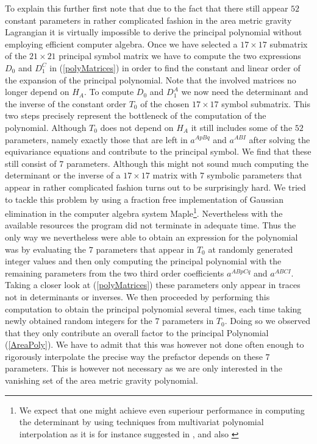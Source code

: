 \documentclass[a4paper,12pt, DIV=14, BCOR=5mm, twoside, headsepline]{scrbook}
\begin{document}
To explain this further first note that due to the fact that there still appear $52$ constant parameters in rather complicated fashion in the area metric gravity Lagrangian it is virtually impossible to derive the principal polynomial without employing efficient computer algebra. Once we have selected a $17 \times 17$ submatrix of the $21 \times 21$ principal symbol matrix we have to compute the two expressions $D_0$ and $D_{1}^C$ in (\ref{polyMatrices}) in order to find the constant and linear order of the expansion of the principal polynomial. Note that the involved matrices no longer depend on $H_A$. To compute $D_0$ and $D_1^A$ we now need the determinant and the inverse of the constant order $T_0$ of the chosen $17 \times 17$ symbol submatrix. This two steps precisely represent the bottleneck of the computation of the polynomial. Although $T_0$ does not depend on $H_A$ it still includes some of the $52$ parameters, namely exactly those that are left in $a^{ApBq}$ and $a^{ABI}$ after solving the equivariance equations and contribute to the principal symbol. We find that these still consist of $7$ parameters. Although this might not sound much computing the determinant or the inverse of a $17 \times 17$ matrix with $7$ symbolic parameters that appear in rather complicated fashion turns out to be surprisingly hard. We tried to tackle this problem by using a fraction free implementation of Gaussian elimination in the computer algebra system Maple\footnote{We expect that one might achieve even superiour performance in computing the determinant by using techniques from multivariat polynomial interpolation as it is for instance suggested in \cite{Qin2018}, \cite{MARCO2004749} and also \cite{articleDet}}. Nevertheless with the available resources the program did not terminate in adequate time. Thus the only way we nevertheless were able to obtain an expression for the polynomial was by evaluating the $7$ parameters that appear in $T_0$ at randomly generated integer values and then only computing the principal polynomial with the remaining parameters from the two third order coefficients $a^{ABpCq}$ and $a^{ABCI}$. Taking a closer look at (\ref{polyMatrices}) these parameters only appear in traces not in determinants or inverses. We then proceeded by performing this computation to obtain the principal polynomial several times, each time taking newly obtained random integers for the $7$ parameters in $T_0$. Doing so we observed that they only contribute an overall factor to the principal Polynomial (\ref{AreaPoly}). We have to admit that this was however not done often enough to rigorously interpolate the precise way the prefactor depends on these $7$ parameters. This is however not necessary as we are only interested in the vanishing set of the area metric gravity polynomial. \\
\end{document}
